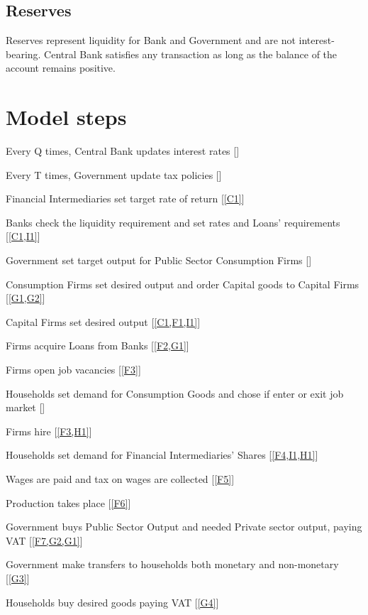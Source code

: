 \documentclass[a4paper, headings=standardclasses]{scrartcl}
\begin{document}
\subsection{Reserves}
Reserves represent liquidity for Bank and Government and are not interest-bearing. Central Bank satisfies any transaction as long as the balance of the account remains positive.

\section{Model steps}
\begin{steps}
	\item \label{C1} Every Q times, Central Bank updates interest rates []
	\item \label{G1} Every T times, Government update tax policies []
	\item \label{I1} Financial Intermediaries set target rate of return [\cref{C1}]
	\item \label{B1} Banks check the liquidity requirement and set rates and Loans' requirements [\cref{C1,I1}]
	\item \label{G2} Government set target output for Public Sector Consumption Firms []
	\item \label{F1} Consumption Firms set desired output and order Capital goods to Capital Firms [\cref{G1,G2}]
	\item \label{F2} Capital Firms set desired output [\cref{C1,F1,I1}]
	\item \label{F3} Firms acquire Loans from Banks [\cref{F2,G1}]
	\item \label{F4} Firms open job vacancies [\cref{F3}]
	\item \label{H1} Households set demand for Consumption Goods and chose if enter or exit job market []
	\item \label{F5} Firms hire [\cref{F3,H1}]
	\item \label{H2} Households set demand for Financial Intermediaries' Shares [\cref{F4,I1,H1}]
	\item \label{F6} Wages are paid and tax on wages are collected [\cref{F5}]
	\item \label{F7} Production takes place [\cref{F6}]
	\item \label{G3} Government buys Public Sector Output and needed Private sector output, paying VAT [\cref{F7,G2,G1}]
	\item \label{G4} Government make transfers to households both monetary and non-monetary  [\cref{G3}]
	\item \label{H3} Households buy desired goods paying VAT [\cref{G4}]

\end{steps}
\end{document}

